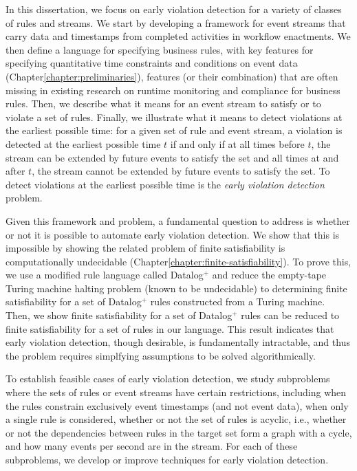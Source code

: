 \medskip

In this dissertation,
we focus on early violation detection
for a variety of classes of rules and streams.
We start by developing a framework
for event streams that carry data and timestamps
from completed activities in workflow enactments.
We then define a language
for specifying business rules,
with key features
for specifying quantitative time constraints and conditions on event data (Chapter\:\ref{chapter:preliminaries}),
features (or their combination) that are often missing in existing research
on runtime monitoring and compliance for business rules.
Then,
we describe what it means for an event stream
to satisfy or to violate a set of rules.
Finally,
we illustrate what it means
to detect violations at the earliest possible time:
for a given set of rule and event stream,
a violation is detected at the earliest possible time $t$
if and only if
at all times before $t$,
the stream can be extended by future events to satisfy the set
and all times at and after $t$,
the stream cannot be extended by future events to satisfy the set.
To detect violations at the earliest possible time
is the {\em early violation detection} problem.

Given this framework and problem,
a fundamental question to address is
whether or not it is possible to automate early violation detection.
We show that this is impossible
by showing the related problem of finite satisfiability
is computationally undecidable
(Chapter\:\ref{chapter:finite-satisfiability}).
To prove this,
we use a modified rule language called Datalog$^{+}$
and
reduce the empty-tape Turing machine halting problem
(known to be undecidable)
to determining finite satisfiability for a set of Datalog$^{+}$ rules
constructed from a Turing machine.
Then, we show finite satisfiability
for a set of Datalog$^{+}$ rules
can be reduced to finite satisfiability for a set of rules in our language.
This result indicates that
early violation detection,
though desirable,
is fundamentally intractable,
and thus
the problem requires simplfying assumptions to be solved algorithmically.

To establish feasible cases of early violation detection,
we study subproblems where the sets of rules or event streams
have certain restrictions,
including
when the rules constrain exclusively event timestamps
(and not event data),
when only a single rule is considered,
whether or not the set of rules is acyclic,
i.e., whether or not the dependencies between rules in the target set
form a graph with a cycle,
and
how many events per second are in the stream.
For each of these subproblems,
we develop or improve techniques for early violation detection.

